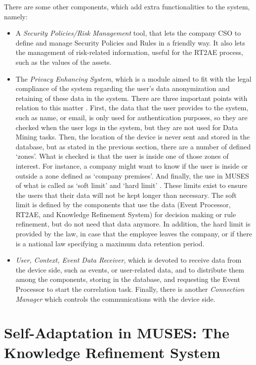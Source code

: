 There are some other components, which add extra functionalities to the system, namely:

\begin{itemize}
  \item A \textit{Security Policies/Risk Management} tool, that lets the company CSO to define and manage Security Policies and Rules in a friendly way. It also lets the management of risk-related information, useful for the RT2AE process, such as the values of the assets.
  \item  The \textit{Privacy Enhancing System}, which is a module aimed to fit with the legal compliance of the system regarding the user's data anonymization and retaining of these data in the system. There are three important points with relation to this matter \cite{deliverable72}. First, the data that the user provides to the system, such as name, or email, is only used for authentication purposes, so they are checked when the user logs in the system, but they are not used for Data Mining tasks. Then, the location of the device is never sent and stored in the database, but as stated in the previous section, there are a number of defined `zones'. What is checked is that the user is inside one of those zones of interest. For instance, a company might want to know if the user is inside or outside a zone defined as `company premises'. And finally, the use in MUSES of what is called as `soft limit' and `hard limit' \cite{deliverable72}. These limits exist to ensure the users that their data will not be kept longer than necessary. The soft limit is defined by the components that use the data (Event Processor, RT2AE, and Knowledge Refinement System) for decision making or rule refinement, but do not need that data anymore. In addition, the hard limit is provided by the law, in case that the employee leaves the company, or if there is a national law specifying a maximum data retention period.
  \item \textit{User, Context, Event Data Receiver}, which is devoted to receive data from the device side, such as events, or user-related data, and to distribute them among the components, storing in the database, and requesting the Event Processor to start the correlation task. Finally, there is another \textit{Connection Manager} which controls the communications with the device side. 
\end{itemize}



\section{Self-Adaptation in MUSES: The Knowledge Refinement System}

